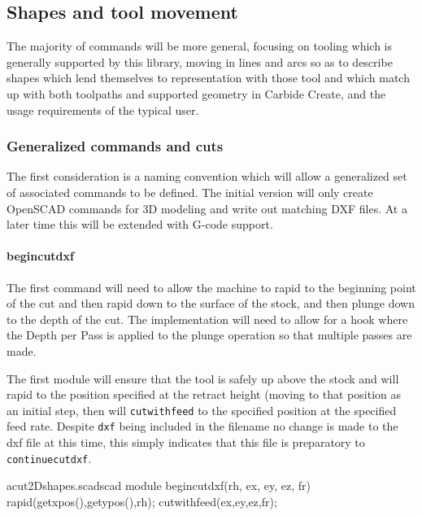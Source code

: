 \documentclass{ltxdoc}
\begin{document}
\addtocounter{cuttwod}{91}
 
\subsection{Shapes and tool movement}
 
The majority of commands will be more general, focusing on tooling which is generally
supported by this library, moving in lines and arcs so as to describe shapes which
lend themselves to representation with those tool and which match up with both
toolpaths and supported geometry in Carbide Create, and the usage requirements of
the typical user.

\subsubsection{Generalized commands and cuts}

The first consideration is a naming convention which will allow a generalized set of associated
commands to be defined. The initial version will only create OpenSCAD commands for 3D modeling
and write out matching DXF files. At a later time this will be extended with G-code support.
 
\paragraph{begincutdxf}
 
The first command will need to allow the machine to rapid to the beginning point of the cut
and then rapid down to the surface of the stock, and then plunge down to the depth of the cut.
The implementation will need to allow for a hook where the Depth per Pass is applied to the 
plunge operation so that multiple passes are made.

 The first module will ensure that the tool is safely up above
the stock and will rapid to the position specified at the retract height (moving to that 
position as an initial step, then will \texttt{cutwithfeed} to the specified position
at the specified feed rate. Despite \texttt{dxf} being included in the filename no change
is made to the dxf file at this time, this simply indicates that this file is preparatory to
\texttt{continuecutdxf}.

\lstset{firstnumber=\thecuttwod}
\begin{writecode}{a}{cut2Dshapes.scad}{scad}
module begincutdxf(rh, ex, ey, ez, fr) {
  rapid(getxpos(),getypos(),rh);
  cutwithfeed(ex,ey,ez,fr);
}

\end{writecode}
\addtocounter{cuttwod}{5}
 
\end{document}
